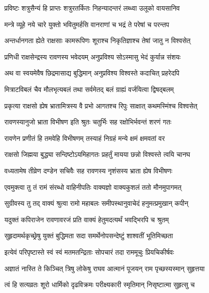 \twolineshloka
{प्रविष्टः शत्रुसैन्यं हि प्राप्तः शत्रुरतर्कितः}
{निहन्यादन्तरं लब्ध्वा उलूको वायसानिव} %

\twolineshloka
{मन्त्रे व्यूहे नये चारे युक्तो भवितुमर्हसि}
{वानराणां च भद्रं ते परेषां च परन्तप} %

\twolineshloka
{अन्तर्धानगता ह्येते राक्षसाः कामरूपिणः}
{शूराश्च निकृतिज्ञाश्च तेषां जातु न विश्वसेत्} %

\twolineshloka
{प्रणिधी राक्षसेन्द्रस्य रावणस्य भवेदयम्}
{अनुप्रविश्य सोऽस्मासु भेदं कुर्यान्न संशयः} %

\twolineshloka
{अथ वा स्वयमेवैष छिद्रमासाद्य बुद्धिमान्}
{अनुप्रविश्य विश्वस्ते कदाचित् प्रहरेदपि} %

\twolineshloka
{मित्राटविबलं चैव मौलभृत्यबलं तथा}
{सर्वमेतद् बलं ग्राह्यं वर्जयित्वा द्विषद्बलम्} %

\twolineshloka
{प्रकृत्या राक्षसो ह्येष भ्रातामित्रस्य वै प्रभो}
{आगतश्च रिपुः साक्षात् कथमस्मिंश्च विश्वसेत्} %

\twolineshloka
{रावणस्यानुजो भ्राता विभीषण इति श्रुतः}
{चतुर्भिः सह रक्षोभिर्भवन्तं शरणं गतः} %

\twolineshloka
{रावणेन प्रणीतं हि तमवेहि विभीषणम्}
{तस्याहं निग्रहं मन्ये क्षमं क्षमवतां वर} %

\twolineshloka
{राक्षसो जिह्मया बुद्ध्या सन्दिष्टोऽयमिहागतः}
{प्रहर्तुं मायया छन्नो विश्वस्ते त्वयि चानघ} %

\twolineshloka
{वध्यतामेष तीव्रेण दण्डेन सचिवैः सह}
{रावणस्य नृशंसस्य भ्राता ह्येष विभीषणः} %

\twolineshloka
{एवमुक्त्वा तु तं रामं संरब्धो वाहिनीपतिः}
{वाक्यज्ञो वाक्यकुशलं ततो मौनमुपागमत्} %

\twolineshloka
{सुग्रीवस्य तु तद् वाक्यं श्रुत्वा रामो महाबलः}
{समीपस्थानुवाचेदं हनुमत्प्रमुखान् कपीन्} %

\twolineshloka
{यदुक्तं कपिराजेन रावणावरजं प्रति}
{वाक्यं हेतुमदत्यर्थं भवद्भिरपि च श्रुतम्} %

\twolineshloka
{सुहृदामर्थकृच्छ्रेषु युक्तं बुद्धिमता सदा}
{समर्थेनोपसन्देष्टुं शाश्वतीं भूतिमिच्छता} %

\twolineshloka
{इत्येवं परिपृष्टास्ते स्वं स्वं मतमतन्द्रिताः}
{सोपचारं तदा राममूचुः प्रियचिकीर्षवः} %

\twolineshloka
{अज्ञातं नास्ति ते किञ्चित् त्रिषु लोकेषु राघव}
{आत्मानं पूजयन् राम पृच्छस्यस्मान् सुहृत्तया} %

\twolineshloka
{त्वं हि सत्यव्रतः शूरो धार्मिको दृढविक्रमः}
{परीक्ष्यकारी स्मृतिमान् निसृष्टात्मा सुहृत्सु च} %

